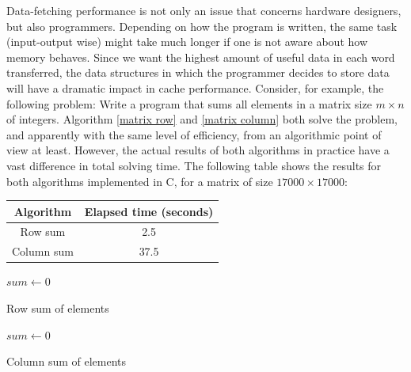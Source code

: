\documentclass[12pt]{diicc}
\begin{document}
Data-fetching performance is not only an issue that concerns hardware designers, but also programmers. Depending on how the program is written, the same task (input-output wise) might take much longer if one is not aware about how memory behaves. Since we want the highest amount of useful data in each word transferred, the data structures in which the programmer decides to store data will have a dramatic impact in cache performance. Consider, for example, the following problem: Write a program that sums all elements in a matrix size $m \times n$ of integers. Algorithm \ref{matrix row} and \ref{matrix column} both solve the problem, and apparently with the same level of efficiency, from an algorithmic point of view at least. However, the actual results of both algorithms in practice have a vast difference in total solving time. The following table shows the results for both algorithms implemented in C, for a matrix of size $17000 \times 17000$:
\begin{center}
\begin{tabular}{ c | c }
  Algorithm & Elapsed time (seconds) \\ \hline
  Row sum & 2.5 \\
  Column sum & 37.5 \\ 
\end{tabular}
\end{center}

\begin{algorithm}
$sum \leftarrow 0$ \\
\caption{Row sum of elements\label{matrix row}}
\end{algorithm}

\begin{algorithm}
$sum \leftarrow 0$ \\
\caption{Column sum of elements\label{matrix column}}
\end{algorithm}
\end{document}
